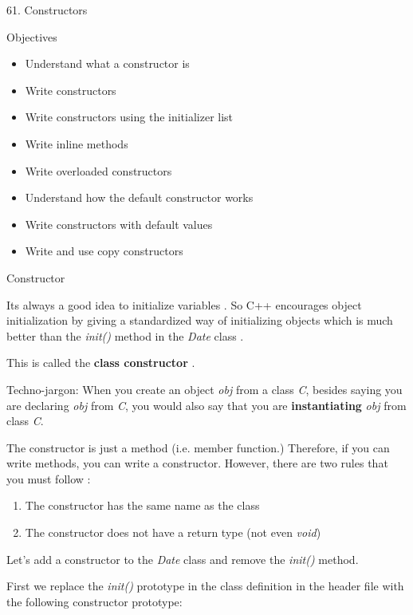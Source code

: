 \documentclass[
]{article}
\author{}
\date{}
\providecommand{\tightlist}{%
  \setlength{\itemsep}{0pt}\setlength{\parskip}{0pt}}
\begin{document}
61. Constructors

Objectives

\begin{itemize}
\tightlist
\item
  Understand what a constructor is
\item
  Write constructors
\item
  Write constructors using the initializer list
\item
  Write inline methods
\item
  Write overloaded constructors
\item
  Understand how the default constructor works
\item
  Write constructors with default values
\item
  Write and use copy constructors
\end{itemize}

Constructor

Its always a good idea to initialize variables . So C++ encourages
object initialization by giving a standardized way of initializing
objects which is much better than the \emph{init()} method in the
\emph{Date} class .

This is called the \textbf{class constructor} .

Techno-jargon: When you create an object \emph{obj} from a class
\emph{C}, besides saying you are declaring \emph{obj} from \emph{C}, you
would also say that you are \textbf{instantiating} \emph{obj} from class
\emph{C}.

The constructor is just a method (i.e. member function.) Therefore, if
you can write methods, you can write a constructor. However, there are
two rules that you must follow :

\begin{enumerate}
\def\labelenumi{\arabic{enumi}.}
\tightlist
\item
  The constructor has the same name as the class
\item
  The constructor does not have a return type (not even \emph{void})
\end{enumerate}

Let's add a constructor to the \emph{Date} class and remove the
\emph{init()} method.

First we replace the \emph{init()} prototype in the class definition in
the header file with the following constructor prototype:

\begin{longtable}[]{@{}@{}}
\toprule
\endhead
\bottomrule
\end{longtable}
\end{document}
